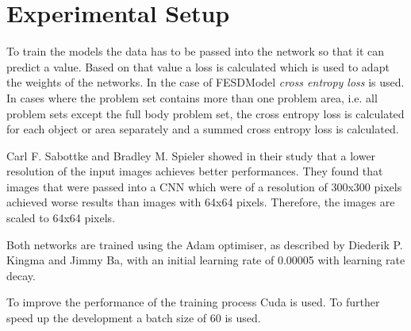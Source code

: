 \section{Experimental Setup}
\label{sec:model_training}

To train the models the data has to be passed into the network so that it can predict a value. Based on that value a loss is calculated which is used to adapt the weights of the networks. In the case of FESDModel \textit{cross entropy loss} is used. In cases where the problem set contains more than one problem area, i.e. all problem sets except the full body problem set, the cross entropy loss is calculated for each object or area separately and a summed cross entropy loss is calculated.

Carl F. Sabottke and Bradley M. Spieler showed in their study that a lower resolution of the input images achieves better performances\cite{LowResGood}. They found that images that were passed into a CNN which were of a resolution of 300x300 pixels achieved worse results than images with 64x64 pixels. Therefore, the images are scaled to 64x64 pixels.

Both networks are trained using the Adam optimiser, as described by Diederik P. Kingma and Jimmy Ba\cite{kingma2017adam}, with an initial learning rate of 0.00005 with learning rate decay.

To improve the performance of the training process Cuda is used. To further speed up the development a batch size of 60 is used.